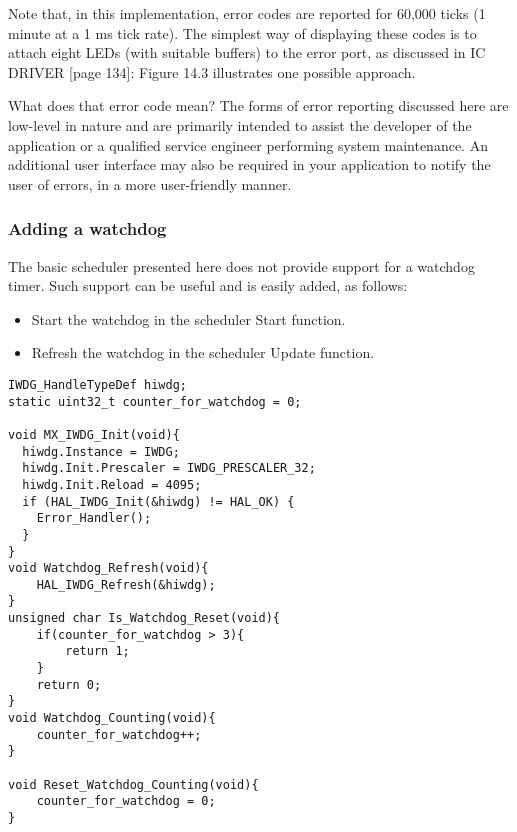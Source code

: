 Note that, in this implementation, error codes are reported for 60,000 ticks (1
minute at a 1 ms tick rate). 
The simplest way of displaying these codes is to attach eight LEDs (with suitable
buffers) to the error port, as discussed in IC DRIVER [page 134]: Figure 14.3 illustrates
one possible approach.



What does that error code mean?
The forms of error reporting discussed here are low-level in nature and are primarily
intended to assist the developer of the application or a qualified service engineer
performing system maintenance. An additional user interface may also be required
in your application to notify the user of errors, in a more user-friendly manner.
\subsubsection{Adding a watchdog}
The basic scheduler presented here does not provide support for a watchdog timer.
Such support can be useful and is easily added, as follows:
\begin{itemize}
    \item Start the watchdog in the scheduler Start function.
    \item Refresh the watchdog in the scheduler Update function.
\end{itemize}

\begin{lstlisting}[basicstyle=\small, caption=An implementation of the ‘watchdog’ functions]
IWDG_HandleTypeDef hiwdg;
static uint32_t counter_for_watchdog = 0;

void MX_IWDG_Init(void){
  hiwdg.Instance = IWDG;
  hiwdg.Init.Prescaler = IWDG_PRESCALER_32;
  hiwdg.Init.Reload = 4095;
  if (HAL_IWDG_Init(&hiwdg) != HAL_OK) {
    Error_Handler();
  }
}
void Watchdog_Refresh(void){
	HAL_IWDG_Refresh(&hiwdg);
}
unsigned char Is_Watchdog_Reset(void){
	if(counter_for_watchdog > 3){
		return 1;
	}
	return 0;
}
void Watchdog_Counting(void){
	counter_for_watchdog++;
}

void Reset_Watchdog_Counting(void){
	counter_for_watchdog = 0;
}
\end{lstlisting}
